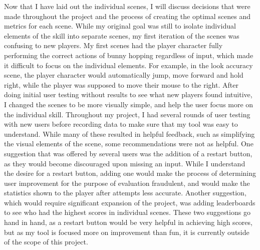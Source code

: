 \documentclass[10pt,twocolumn]{article}
\begin{document}
Now that I have laid out the individual scenes, I will discuss decisions that were made throughout the project and the process of creating the optimal scenes and metrics for each scene. While my original goal was still to isolate individual elements of the skill into separate scenes, my first iteration of the scenes was confusing to new players. My first scenes had the player character fully performing the correct actions of bunny hopping regardless of input, which made it difficult to focus on the individual elements. For example, in the look accuracy scene, the player character would automatically jump, move forward and hold right, while the player was supposed to move their mouse to the right. After doing initial user testing without results to see what new players found intuitive, I changed the scenes to be more visually simple, and help the user focus more on the individual skill. Throughout my project, I had several rounds of user testing with new users before recording data to make sure that my tool was easy to understand. While many of these resulted in helpful feedback, such as simplifying the visual elements of the scene, some recommendations were not as helpful. One suggestion that was offered by several users was the addition of a restart button, as they would become discouraged upon missing an input. While I understand the desire for a restart button, adding one would make the process of determining user improvement for the purpose of evaluation fraudulent, and would make the statistics shown to the player after attempts less accurate. Another suggestion, which would require significant expansion of the project, was adding leaderboards to see who had the highest scores in individual scenes. These two suggestions go hand in hand, as a restart button would be very helpful in achieving high scores, but as my tool is focused more on improvement than fun, it is currently outside of the scope of this project.
\end{document}
